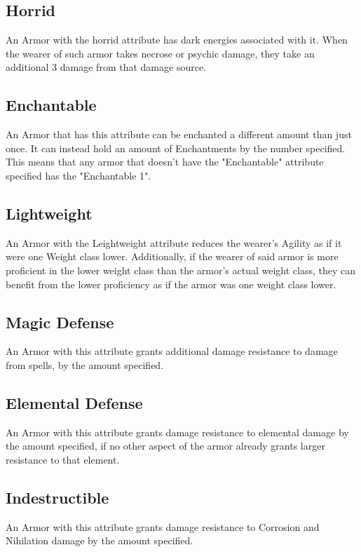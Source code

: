\subsection{Horrid}\label{armor:horrid}
An Armor with the horrid attribute has dark energies associated with it.
When the wearer of such armor takes necrose or psychic damage, they take an additional 3 damage from that damage source.

\subsection{Enchantable}\label{armor:enchantable}
An Armor that has this attribute can be enchanted a different amount than just once.
It can instead hold an amount of Enchantments by the number specified.
This means that any armor that doesn't have the "Enchantable" attribute specified has the "Enchantable 1".

\subsection{Lightweight}\label{armor:lightweight}
An Armor with the Leightweight attribute reduces the wearer's Agility as if it were one Weight class lower.
Additionally, if the wearer of said armor is more proficient in the lower weight class than the armor's actual weight class, they can benefit from the lower proficiency as if the armor was one weight class lower.

\subsection{Magic Defense}\label{armor:magicDefense}
An Armor with this attribute grants additional damage resistance to damage from spells, by the amount specified.

\subsection{Elemental Defense}\label{armor:elementalDefense}
An Armor with this attribute grants damage resistance to elemental damage by the amount specified, if no other aspect of the armor already grants larger resistance to that element.

\subsection{Indestructible}\label{armor:indestructible}
An Armor with this attribute grants damage resistance to Corrosion and Nihilation damage by the amount specified.

